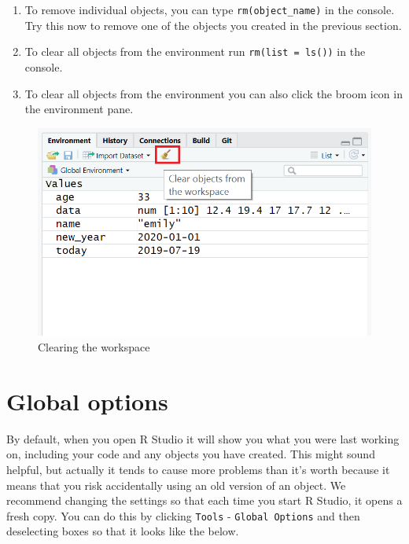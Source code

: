 \documentclass[
  oneside]{book}
\providecommand{\tightlist}{%
  \setlength{\itemsep}{0pt}\setlength{\parskip}{0pt}}
\begin{document}
\begin{enumerate}
\def\labelenumi{\arabic{enumi}.}
\tightlist
\item
  To remove individual objects, you can type \texttt{rm(object\_name)} in the console. Try this now to remove one of the objects you created in the previous section.
\item
  To clear all objects from the environment run \texttt{rm(list\ =\ ls())} in the console.
\item
  To clear all objects from the environment you can also click the broom icon in the environment pane.
\end{enumerate}

\begin{figure}

{\centering \includegraphics[width=1\linewidth]{images/broom} 

}

\caption{Clearing the workspace}\label{fig:img-broom}
\end{figure}

\hypertarget{global-options}{%
\section{Global options}\label{global-options}}

By default, when you open R Studio it will show you what you were last working on, including your code and any objects you have created. This might sound helpful, but actually it tends to cause more problems than it's worth because it means that you risk accidentally using an old version of an object. We recommend changing the settings so that each time you start R Studio, it opens a fresh copy. You can do this by clicking \texttt{Tools} - \texttt{Global\ Options} and then deselecting boxes so that it looks like the below.
\end{document}
